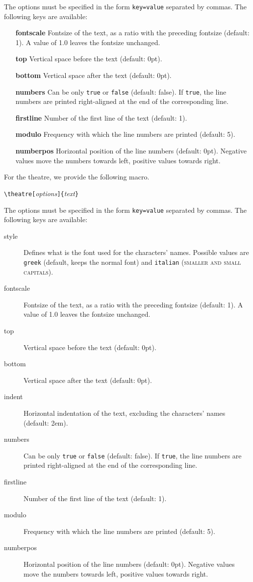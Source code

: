 \documentclass[11pt,a4paper]{article}
\begin{document}
	The options must be specified in the form \verb|key=value| separated by commas. The following keys are available:
	\begin{itemize}
		\item[\textbf{fontscale}] Fontsize of the text, as a ratio with the preceding fontsize (default: 1). A value of 1.0 leaves the fontsize  unchanged.
		\item[\textbf{top}] Vertical space before the text (default: 0pt).
		\item[\textbf{bottom}] Vertical space after the text (default: 0pt).
		\item[\textbf{numbers}] Can be only \verb|true| or \verb|false| (default: false). If \verb|true|, the line numbers are printed right-aligned at the end of the corresponding line.
		\item[\textbf{firstline}] Number of the first line of the text (default: 1).
		\item[\textbf{modulo}] Frequency with which the line numbers are printed (default: 5).
		\item[\textbf{numberpos}] Horizontal position of the line numbers (default: 0pt). Negative values move the numbers towards left, positive values towards right.
	\end{itemize}
	
	For the theatre, we provide the following macro.
	
	\medskip
	
	\verb|\theatre[|\emph{options}\verb|]{|\emph{text}\verb|}| 	
	
	\medskip
	
	The options must be specified in the form \verb|key=value| separated by commas. The following keys are available:
	\begin{description}
    \item[style] Defines what is the font used for the characters' names. Possible values are \verb|greek| (default, keeps the normal font) and \verb|italian| ({\smaller\scshape smaller and small capitals}).
		\item[fontscale] Fontsize of the text, as a ratio with the preceding fontsize (default: 1). A value of 1.0 leaves the fontsize  unchanged.
		\item[top] Vertical space before the text (default: 0pt).
		\item[bottom] Vertical space after the text (default: 0pt).
		\item[indent] Horizontal indentation of the text, excluding the characters' names (default: 2em).
		\item[numbers] Can be only \verb|true| or \verb|false| (default: false). If \verb|true|, the line numbers are printed right-aligned at the end of the corresponding line.
		\item[firstline] Number of the first line of the text (default: 1).
		\item[modulo] Frequency with which the line numbers are printed (default: 5).
		\item[numberpos] Horizontal position of the line numbers (default: 0pt). Negative values move the numbers towards left, positive values towards right.
	\end{description}
	
\end{document}
